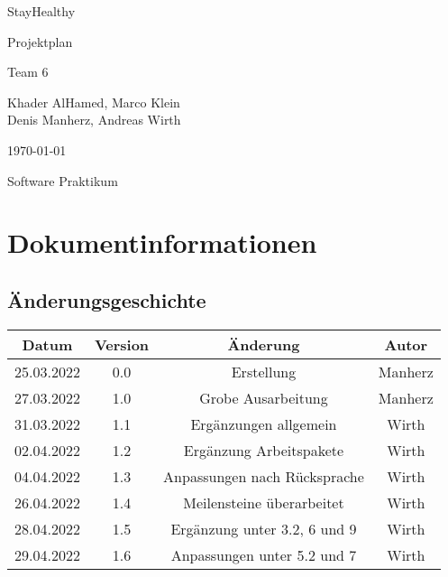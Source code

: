 \documentclass[12pt,a4paper,onecolumn]{article}
\newcommand\titleofdoc{StayHealthy} %
\newcommand\GroupName{Team 6} %
\begin{document}
\begin{titlepage}
   \begin{center}
        \vspace*{4cm} %

        \Huge{\titleofdoc} 

        \vspace{0.5cm}
        \LARGE{Projektplan}
            
        \vspace{3 cm}
        \Large{\GroupName}
       
        \vspace{0.25cm}
        \large{Khader AlHamed, Marco Klein\\Denis Manherz, Andreas Wirth}
       
        \vspace{3 cm}
        \Large{\today}%
        
        \vspace{0.25 cm}
        \Large{Software Praktikum}
       

       \vfill
    \end{center}
\end{titlepage}
\setcounter{page}{2}
\tableofcontents
\newpage

\section{Dokumentinformationen} 
\subsection{Änderungsgeschichte}
\begin{center}
\begin{tabular}{ |c|c|c|c| } 
 \hline
 Datum & Version & Änderung & Autor\\ 
 \hline
 25.03.2022 & 0.0 & Erstellung & Manherz \\ 
 \hline
 27.03.2022 & 1.0 & Grobe Ausarbeitung & Manherz\\
 \hline
 31.03.2022 & 1.1 & Ergänzungen allgemein & Wirth\\
 \hline
 02.04.2022 & 1.2 & Ergänzung Arbeitspakete & Wirth\\
 \hline
 04.04.2022 & 1.3 & Anpassungen nach Rücksprache & Wirth\\
 \hline
 26.04.2022 & 1.4 & Meilensteine überarbeitet & Wirth\\
 \hline
 28.04.2022 & 1.5 & Ergänzung unter 3.2, 6 und 9 & Wirth\\
 \hline
 29.04.2022 & 1.6 & Anpassungen unter 5.2 und 7 & Wirth\\
 \hline
\end{tabular}
\end{center}
\end{document}
